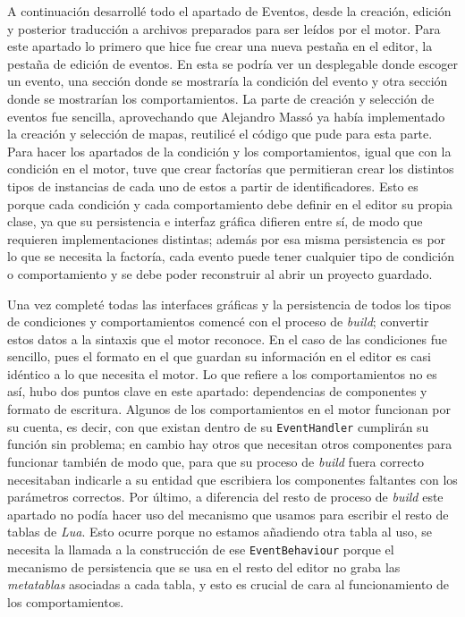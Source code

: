 \medskip
 
A continuación desarrollé todo el apartado de Eventos, desde la creación, edición y posterior traducción a archivos preparados para ser leídos por el motor. Para este apartado lo primero que hice fue crear una nueva pestaña en el editor, la pestaña de edición de eventos. En esta se podría ver un desplegable donde escoger un evento, una sección donde se mostraría la condición del evento y otra sección donde se mostrarían los comportamientos. 
La parte de creación y selección de eventos fue sencilla, aprovechando que Alejandro Massó ya había implementado la creación y selección de mapas, reutilicé el código que pude para esta parte. Para hacer los apartados de la condición y los comportamientos, igual que con la condición en el motor, tuve que crear factorías que permitieran crear los distintos tipos de instancias de cada uno de estos a partir de identificadores. Esto es porque cada condición y cada comportamiento debe definir en el editor su propia clase, ya que su persistencia e interfaz gráfica difieren entre sí, de modo que requieren implementaciones distintas; además por esa misma persistencia es por lo que se necesita la factoría, cada evento puede tener cualquier tipo de condición o comportamiento y se debe poder reconstruir al abrir un proyecto guardado.

\medskip

Una vez completé todas las interfaces gráficas y la persistencia de todos los tipos de condiciones y comportamientos comencé con el proceso de \textit{build}; convertir estos datos a la sintaxis que el motor reconoce. En el caso de las condiciones fue sencillo, pues el formato en el que guardan su información en el editor es casi idéntico a lo que necesita el motor. Lo que refiere a los comportamientos no es así, hubo dos puntos clave en este apartado: dependencias de componentes y formato de escritura. Algunos de los comportamientos en el motor funcionan por su cuenta, es decir, con que existan dentro de su \texttt{EventHandler} cumplirán su función sin problema; en cambio hay otros que necesitan otros componentes para funcionar también de modo que, para que su proceso de \textit{build} fuera correcto necesitaban indicarle a su entidad que escribiera los componentes faltantes con los parámetros correctos. Por último, a diferencia del resto de proceso de \textit{build} este apartado no podía hacer uso del mecanismo que usamos para escribir el resto de tablas de \textit{Lua}. Esto ocurre porque no estamos añadiendo otra tabla al uso, se necesita la llamada a la construcción de ese \texttt{EventBehaviour} porque el mecanismo de persistencia que se usa en el resto del editor no graba las \textit{metatablas} asociadas a cada tabla, y esto es crucial de cara al funcionamiento de los comportamientos.

